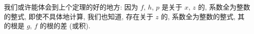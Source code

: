 \documentclass[../libro.tex]{subfiles}
\begin{document}
\begin{example}
    我们或许能体会到上个定理的好的地方:
    因为 \(f\), \(h\), \(p\) 是关于 \(x\), \(z\) 的,
    系数全为整数的整式,
    即使不具体地计算, 我们也知道,
    存在关于 \(z\) 的, 系数全为整数的整式,
    其的根是 \(g\), \(f\) 的根的差 (或积).

\end{example}
\end{document}
